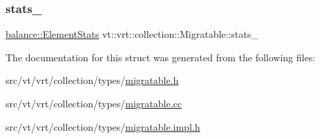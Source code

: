 \mbox{\label{structvt_1_1vrt_1_1collection_1_1_migratable_a3572db662dd07c4f00b32e6198ef8da9}} 
\subsubsection{\texorpdfstring{stats\+\_\+}{stats\_}}
{\footnotesize\ttfamily \hyperlink{structvt_1_1vrt_1_1collection_1_1balance_1_1_element_stats}{balance\+::\+Element\+Stats} vt\+::vrt\+::collection\+::\+Migratable\+::stats\+\_\+\hspace{0.3cm}{\ttfamily [protected]}}



The documentation for this struct was generated from the following files\+:\begin{DoxyCompactItemize}
\item 
src/vt/vrt/collection/types/\hyperlink{migratable_8h}{migratable.\+h}\item 
src/vt/vrt/collection/types/\hyperlink{migratable_8cc}{migratable.\+cc}\item 
src/vt/vrt/collection/types/\hyperlink{migratable_8impl_8h}{migratable.\+impl.\+h}\end{DoxyCompactItemize}
